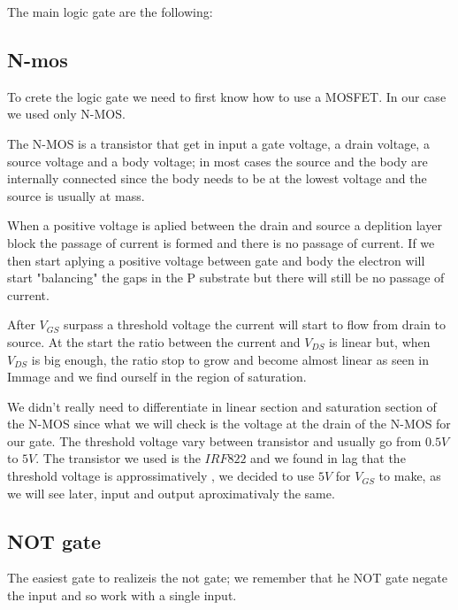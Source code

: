 \documentclass{article}
\begin{document}
The main logic gate are the following:



\subsection{N-mos}

To crete the logic gate we need to first know how to use a MOSFET. In our case we used only N-MOS. 

\vspace{3mm}

The N-MOS is a transistor that get in input a gate voltage, a drain voltage, a source voltage and a body voltage; in most cases the source and the body are internally connected since the body needs to be at the lowest voltage and the source is usually at mass.

When a positive voltage is aplied between the drain and source a deplition layer block the passage of current is formed and there is no passage of current. 
If we then start aplying a positive voltage between gate and body the electron will start "balancing" the gaps in the P substrate but there will still be no passage of current. 

After $V_{GS}$ surpass a threshold voltage the current will start to flow from drain to source. At the start the ratio between the current and $V_{DS}$ is linear but, when $V_{DS}$ is big enough, the ratio stop to grow and become almost linear as seen in Immage %
and we find ourself in the region of saturation.

\vspace{3mm}

We didn't really need to differentiate in linear section and saturation section of the N-MOS since what we will check is the voltage at the drain of the N-MOS for our gate.
The threshold voltage vary between transistor and usually go from $0.5V$ to $5V$. 
The transistor we used is the $IRF822$ and we found in lag that the threshold voltage is approssimatively %
, we decided to use $5V$ for $V_{GS}$ to make, as we will see later, input and output aproximativaly the same.



\subsection{NOT gate}

The easiest gate to realizeis the not gate; we remember that he NOT gate negate the input and so work with a single input.
\end{document}
